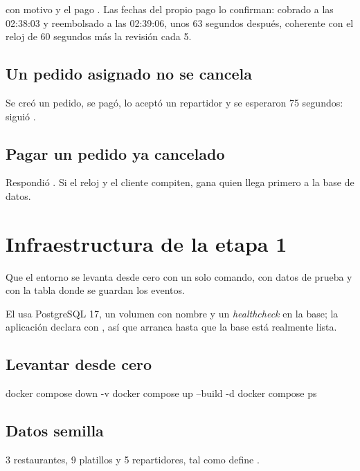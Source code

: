 \documentclass[11pt]{article}
\begin{document}
\observado {} con motivo  y el pago . Las fechas del
propio pago lo confirman: cobrado a las 02:38:03 y reembolsado a las 02:39:06, unos 63 segundos
después, coherente con el reloj de 60 segundos más la revisión cada 5.

\subsection{Un pedido asignado no se cancela}
Se creó un pedido, se pagó, lo aceptó un repartidor y se esperaron 75 segundos: siguió .

\subsection{Pagar un pedido ya cancelado}
Respondió . Si el reloj y el cliente compiten, gana quien llega primero a la base de datos.

\section{Infraestructura de la etapa 1}

\queria Que el entorno se levanta desde cero con un solo comando, con datos de prueba y con la tabla
donde se guardan los eventos.

El  usa PostgreSQL 17, un volumen con nombre y un \emph{healthcheck} en la
base; la aplicación declara  con , así que arranca
hasta que la base está realmente lista.

\subsection{Levantar desde cero}
\begin{comando}
docker compose down -v
docker compose up --build -d
docker compose ps
\end{comando}

\subsection{Datos semilla}
3 restaurantes, 9 platillos y 5 repartidores, tal como define .
\end{document}
